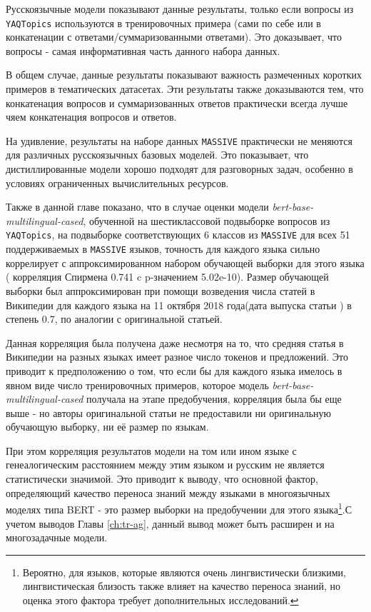 Русскоязычные модели показывают данные результаты, только если вопросы из  \texttt{YAQTopics} используются в тренировочных примера (сами по себе или в конкатенации с ответами/суммаризованными ответами). Это доказывает, что вопросы - самая информативная часть данного набора данных. 

В общем случае, данные результаты показывают важность размеченных коротких примеров в тематических датасетах. Эти результаты также доказываются тем, что конкатенация вопросов и суммаризованных ответов практически всегда лучше чяем конкатенация вопросов и ответов. 

На удивление, результаты на наборе данных \texttt{MASSIVE} практически не меняются для различных русскоязычных базовых моделей. Это показывает, что дистиллированные модели хорошо подходят для разговорных задач, особенно в условиях ограниченных вычислительных ресурсов. 

Также в данной главе показано, что в случае оценки модели  \textit{bert-base-multilingual-cased}, обученной на шестиклассовой подвыборке вопросов из \texttt{YAQTopics}, на подвыборке соответствующих 6 классов из \texttt{MASSIVE} для всех 51 поддерживаемых в \texttt{MASSIVE} языков, точность для каждого языка сильно коррелирует с аппроксимированном набором обучающей выборки для этого языка ( корреляция Спирмена 0.741 c p-значением 5.02e-10). Размер обучающей выборки был аппроксимирован при помощи возведения числа статей в Википедии для каждого языка на 11 октября 2018 года(дата выпуска статьи \cite{bert}) в степень 0.7, по аналогии с оригинальной статьей. 

Данная корреляция была получена даже несмотря на то, что средняя статья в Википедии на разных языках имеет разное число токенов и предложений. Это приводит к предположению о том, что если бы для каждого языка имелось в явном виде число тренировочных примеров, которое модель \textit{bert-base-multilingual-cased} получала на этапе предобучения, корреляция была бы еще выше - но авторы оригинальной статьи не предоставили ни оригинальную обучающую выборку, ни её размер по языкам. 

При этом корреляция результатов модели на том или ином языке с генеалогическим расстоянием между этим языком и русским не является статистически значимой. Это приводит к выводу, что основной фактор, определяющий качество переноса знаний между языками в многоязычных моделях типа BERT - это размер выборки на предобучении для этого языка\footnote{Вероятно, для языков, которые являются очень лингвистически близкими, лингвистическая близость также влияет на качество переноса знаний, но оценка этого фактора требует дополнительных исследований.}.С учетом выводов Главы \ref{ch:tr-ag}, данный вывод может быть расширен и на многозадачные модели. 


 